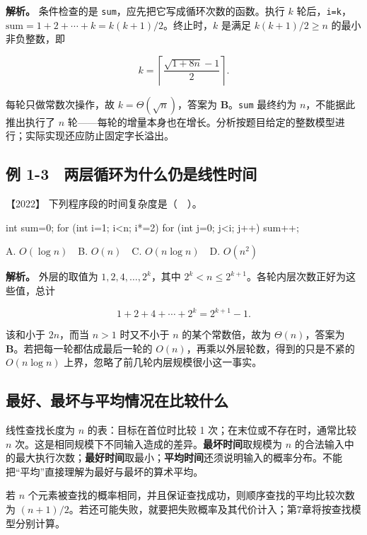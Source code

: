 \textbf{解析。} 条件检查的是 \texttt{sum}，应先把它写成循环次数的函数。执行 \(k\) 轮后，\texttt{i=\allowbreak{}k}，\(\mathrm{sum}=1+2+\cdots+k=k(k+1)/2\)。终止时，\(k\) 是满足 \(k(k+1)/2\ge n\) 的最小非负整数，即

\[k=\left\lceil\frac{\sqrt{1+8n}-1}{2}\right\rceil.\]

每轮只做常数次操作，故 \(k=\Theta(\sqrt n)\)，答案为 \textbf{B}。\texttt{sum} 最终约为 \(n\)，不能据此推出执行了 \(n\) 轮------每轮的增量本身也在增长。分析按题目给定的整数模型进行；实际实现还应防止固定字长溢出。

\subsection{例 1-3　两层循环为什么仍是线性时间}\label{DS01-ex3}

\begin{example}[配套例题]

【2022】 下列程序段的时间复杂度是（　）。

\begin{codeblock}[language=C]
int sum=0;
for (int i=1; i<n; i*=2)
    for (int j=0; j<i; j++)
        sum++;
\end{codeblock}

A. \(O(\log n)\)　B. \(O(n)\)　C. \(O(n\log n)\)　D. \(O(n^2)\)

\end{example}

\textbf{解析。} 外层的取值为 \(1,2,4,\ldots,2^k\)，其中 \(2^k<n\le2^{k+1}\)。各轮内层次数正好为这些值，总计

\[1+2+4+\cdots+2^k=2^{k+1}-1.\]

该和小于 \(2n\)，而当 \(n>1\) 时又不小于 \(n\) 的某个常数倍，故为 \(\Theta(n)\)，答案为 \textbf{B}。若把每一轮都估成最后一轮的 \(O(n)\)，再乘以外层轮数，得到的只是不紧的 \(O(n\log n)\) 上界，忽略了前几轮内层规模很小这一事实。

\subsection{最好、最坏与平均情况在比较什么}\label{DS01-detail2}

线性查找长度为 \(n\) 的表：目标在首位时比较 1 次；在末位或不存在时，通常比较 \(n\) 次。这是相同规模下不同输入造成的差异。\textbf{最坏时间}取规模为 \(n\) 的合法输入中的最大执行次数；\textbf{最好时间}取最小；\textbf{平均时间}还须说明输入的概率分布。不能把``平均''直接理解为最好与最坏的算术平均。

若 \(n\) 个元素被查找的概率相同，并且保证查找成功，则顺序查找的平均比较次数为 \((n+1)/2\)。若还可能失败，就要把失败概率及其代价计入；第7章将按查找模型分别计算。

